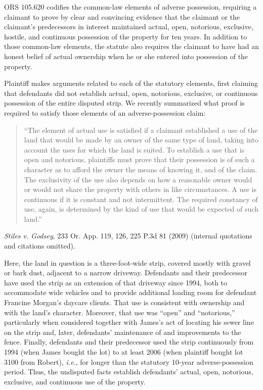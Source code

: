 ORS 105.620 codifies the common-law elements of adverse possession, requiring a
claimant to prove by clear and convincing evidence that the claimant or the
claimant's predecessors in interest maintained actual, open, notorious,
exclusive, hostile, and continuous possession of the property for ten years. In
addition to those common-law elements, the statute also requires the claimant
to have had an honest belief of actual ownership when he or she entered into
possession of the property.

Plaintiff makes arguments related to each of the statutory elements, first
claiming that defendants did not establish actual, open, notorious, exclusive,
or continuous possession of the entire disputed strip. We recently summarized
what proof is required to satisfy those elements of an adverse-possession
claim:
\begin{quote}
``The element of actual use is satisfied if a claimant established a use of
the land that would be made by an owner of the same type of land, taking into
account the uses for which the land is suited. To establish a use that is open
and notorious, plaintiffs must prove that their possession is of such a
character as to afford the owner the means of knowing it, and of the claim. The
exclusivity of the use also depends on how a reasonable owner would or would
not share the property with others in like circumstances. A use is continuous
if it is constant and not intermittent. The required constancy of use,
again, is determined by the kind of use that would be expected of such land.''
\end{quote}
\textit{Stiles v. Godsey}, 233 Or. App. 119, 126, 225 P.3d 81 (2009) (internal
quotations and citations omitted).

Here, the land in question is a three-foot-wide strip, covered mostly with
gravel or bark dust, adjacent to a narrow driveway. Defendants and their
predecessor have used the strip as an extension of that driveway since 1994,
both to accommodate wide vehicles and to provide additional loading room for
defendant Francine Morgan's daycare clients. That use is consistent with
ownership and with the land's character. Moreover, that use was ``open'' and
``notorious,'' particularly when considered together with James's act of
locating his sewer line on the strip and, later, defendants' maintenance of and
improvements to the fence. Finally, defendants and their predecessor used the
strip continuously from 1994 (when James bought the lot) to at least 2006 (when
plaintiff bought lot 3100 from Robert), \textit{i.e.}, for longer than the
statutory 10-year adverse-possession period. Thus, the undisputed facts
establish defendants' actual, open, notorious, exclusive, and continuous use of
the property.

